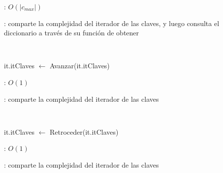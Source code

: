 \begin{Algoritmos}
	\complejidad: $O(|c_{max}|)$

	\justifcomp: comparte la complejidad del iterador de las claves, y luego consulta el diccionario a través de su función de obtener

	~

	\begin{algorithm}[H]
		\NoCaptionOfAlgo
		\caption{}
		it.itClaves $\leftarrow$ Avanzar(it.itClaves)
	\end{algorithm}

	\complejidad: $O(1)$

	\justifcomp: comparte la complejidad del iterador de las claves

	~

	\begin{algorithm}[H]
		\NoCaptionOfAlgo
		\caption{}
		it.itClaves $\leftarrow$ Retroceder(it.itClaves)
	\end{algorithm}

	\complejidad: $O(1)$

	\justifcomp: comparte la complejidad del iterador de las claves

\end{Algoritmos}